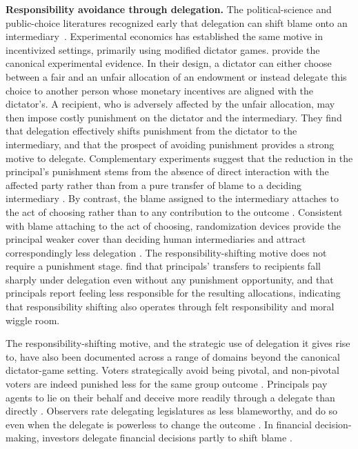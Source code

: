 \textbf{Responsibility avoidance through delegation.} The political-science and public-choice literatures recognized early that delegation can shift blame onto an intermediary~\citep{weaver_politics_1986, fiorina_legislator_1986}. Experimental economics has established the same motive in incentivized settings, primarily using modified dictator games. \citet{bartling_shifting_2012} provide the canonical experimental evidence. In their design, a dictator can either choose between a fair and an unfair allocation of an endowment or instead delegate this choice to another person whose monetary incentives are aligned with the dictator's. A recipient, who is adversely affected by the unfair allocation, may then impose costly punishment on the dictator and the intermediary. They find that delegation effectively shifts punishment from the dictator to the intermediary, and that the prospect of avoiding punishment provides a strong motive to delegate. Complementary experiments suggest that the reduction in the principal's punishment stems from the absence of direct interaction with the affected party rather than from a pure transfer of blame to a deciding intermediary \citep{coffman_intermediation_2011}. %
By contrast, the blame assigned to the intermediary attaches to the act of choosing rather than to any contribution to the outcome \citep{oexl_shifting_2013}. %
Consistent with blame attaching to the act of choosing, randomization devices provide the principal weaker cover than deciding human intermediaries \citep{bartling_shifting_2012, oexl_shifting_2013} and attract correspondingly less delegation \citep{bartling_shifting_2012}. The responsibility-shifting motive does not require a punishment stage. \citet{hamman_self-interest_2010} find that principals' transfers to recipients fall sharply under delegation even without any punishment opportunity, and that principals report feeling less responsible for the resulting allocations, indicating that responsibility shifting also operates through felt responsibility and moral wiggle room.

The responsibility-shifting motive, and the strategic use of delegation it gives rise to, have also been documented across a range of domains beyond the canonical dictator-game setting. Voters strategically avoid being pivotal, and non-pivotal voters are indeed punished less for the same group outcome \citep{bartling_fischbacher_schudy_2015}. Principals pay agents to lie on their behalf and deceive more readily through a delegate than directly \citep{erat_avoiding_2013, kandul_do_2018, gawn_lying_2019}. Observers rate delegating legislatures as less blameworthy, and do so even when the delegate is powerless to change the outcome \citep{hill_does_2015}. In financial decision-making, investors delegate financial decisions partly to shift blame \citep{holzmeister_delegation_2023, freer_friedman_weidenholzer_2024}.

